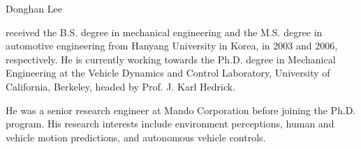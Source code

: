 \documentclass[journal]{IEEEtran}
\begin{document}
	
	
	\addtolength{\textheight}{-0cm}   %
	
	
	

 
\begin{IEEEbiography}{Donghan Lee}

received the B.S. degree in mechanical engineering and the M.S. degree in automotive engineering from Hanyang University in Korea, in 2003 and 2006, respectively. He is currently working towards the Ph.D. degree in Mechanical Engineering at the Vehicle Dynamics and Control Laboratory, University of California, Berkeley, headed by Prof. J. Karl Hedrick. 

He was a senior research engineer at Mando Corporation before joining the Ph.D. program. 
His research interests include environment perceptions, human and vehicle motion predictions, and autonomous vehicle controls.  
\end{IEEEbiography}
\end{document}
